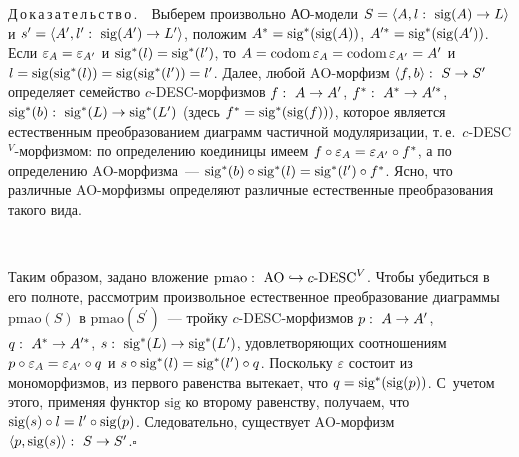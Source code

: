 \begin{multicols}{2}
 \noindent
 Д\,о\,к\,а\,з\,а\,т\,е\,л\,ь\,с\,т\,в\,о\,.\ \ Выберем произвольно АО-мо\-де\-ли
$S \hm= \langle A, l:\ \mathrm{sig}(A) \to L\rangle$ и $s^\prime\hm = \langle A^\prime, l^\prime:\
\mathrm{sig}(A^\prime) \to L^\prime\rangle$, положим $A^*\hm = \mathrm{sig}^*(\mathrm{sig}(A))$,
$A^{\prime*}\hm = \mathrm{sig}^*(\mathrm{sig}(A^\prime))$. Если $\varepsilon_A \hm=
\varepsilon_{A^\prime}$ и $\mathrm{sig}^*(l) \hm= \mathrm{sig}^*(l^\prime)$, то $A\hm =
\mathrm{codom}\, \varepsilon_A\hm = \mathrm{codom}\,\varepsilon_{A^\prime} \hm=
A^\prime$ и $l \hm= \mathrm{sig}(\mathrm{sig}^*(l)) \hm= \mathrm{sig}(\mathrm{sig}^*(l^\prime)) \hm= l^\prime$.
Далее, любой $\mathrm{AO}$-мор\-физм $\langle f, b\rangle:\ S \hm\to S^\prime$ определяет
семейство $c$-DESC-мор\-физ\-мов $f:\ A \hm\to A^\prime$,
\mbox{$f^*:\ A^* \hm\to A^{\prime *}$,}
$\mathrm{sig}^*(b):\ \mathrm{sig}^*(L) \hm\to \mathrm{sig}^*(L^\prime)$ (здесь $f^* \hm=
\mathrm{sig}^*(\mathrm{sig}(f)))$, которое является естественным преобразованием диаграмм
частичной модуляризации, т.\,е.\ $c$-DESC$^V$-мор\-физ\-мом: по определению
коединицы имеем $f \circ \varepsilon_A \hm= \varepsilon_{A^\prime}\circ f^*$, а
по определению $\mathrm{AO}$-мор\-физ\-ма~--- $\mathrm{sig}^*(b) \circ \mathrm{sig}^*(l) \hm=
\mathrm{sig}^*(l^\prime) \circ f^*$. Ясно, что различные
 AO-мор\-физ\-мы определяют различные естественные преобразования
такого вида.

\vspace*{9pt}
 \begin{center}
 \mbox{%
 \epsfxsize=69.856mm
 }
 \end{center}


 Таким образом, задано вложение $\mathrm{pmao}:\ \mathrm{AO}\hm\hookrightarrow
 c\mbox{-}\mathrm{DESC}^V$. Чтобы убедиться в его полноте, рассмотрим
произвольное естественное преобразование диаграммы $\mathrm{pmao}(S)$ в
$\mathrm{pmao}(S^\prime)$~--- тройку\linebreak
 $c$-DESC-мор\-физ\-мов $p:\ A\hm\to A^\prime$,
$q:\ A^* \hm\to A^{\prime *}$, $s:\ \mathrm{sig}^*(L)\hm\to \mathrm{sig}^*(L^\prime)$,
удовлетворяющих соотношениям $p\circ\varepsilon_A\hm =
\varepsilon_{A^\prime}\circ q$ и $s \circ \mathrm{sig}^*(l) \hm= \mathrm{sig}^*(l^\prime) \circ q$.
Поскольку $\varepsilon$ состоит из мономорфизмов, из первого равенства
вытекает, что $q \hm= \mathrm{sig}^*(\mathrm{sig}(p))$. С~учетом этого, применяя функтор
$\mathrm{sig}$ ко
второму равенству, получаем, что $\mathrm{sig}(s) \circ l \hm= l^\prime \circ \mathrm{sig}(p)$.
Следовательно, существует $\mathrm{AO}$-мор\-физм $\langle p, \mathrm{sig}(s)\rangle:\ S \hm\to
S^\prime$.\hfill$\square$


\end{multicols}
